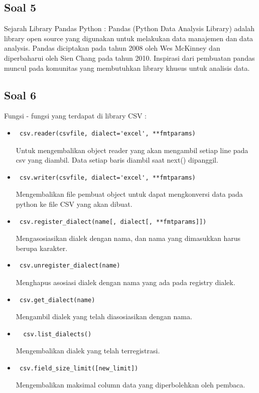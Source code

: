 \subsection{Soal 5}
Sejarah Library Pandas Python : 
Pandas (Python Data Analysis Library) adalah library open source yang digunakan untuk melakukan data manajemen dan data analysis. Pandas diciptakan pada tahun 2008 oleh Wes McKinney dan diperbaharui oleh Sien Chang pada tahun 2010. Inspirasi dari pembuatan pandas muncul pada komunitas yang membutuhkan library khusus untuk analisis data. 
\subsection{Soal 6}
Fungsi - fungsi yang terdapat di library CSV : 
\begin{itemize}
	\item \begin{verbatim} csv.reader(csvfile, dialect='excel', **fmtparams) \end{verbatim} Untuk mengembalikan	object reader yang akan mengambil setiap line pada csv yang diambil. Data setiap baris diambil saat next() dipanggil. 
	\item \begin{verbatim} csv.writer(csvfile, dialect='excel', **fmtparams) \end{verbatim} Mengembalikan file pembuat object untuk dapat mengkonversi data pada python ke file CSV yang akan dibuat. 
	\item \begin{verbatim} csv.register_dialect(name[, dialect[, **fmtparams]]) \end{verbatim} Mengasosiasikan dialek dengan nama, dan nama yang dimasukkan harus berupa karakter.
	\item \begin{verbatim} csv.unregister_dialect(name) \end{verbatim}
	Menghapus asosiasi dialek dengan nama yang ada pada registry dialek.
	\item \begin{verbatim} csv.get_dialect(name) \end{verbatim}
	Mengambil dialek yang telah diasosiasikan dengan nama. 
	\item \begin{verbatim}  csv.list_dialects() \end{verbatim} Mengembalikan dialek yang telah terregistrasi.
	\item \begin{verbatim} csv.field_size_limit([new_limit]) \end{verbatim} Mengembalikan maksimal column data yang diperbolehkan oleh pembaca.
\end{itemize}
